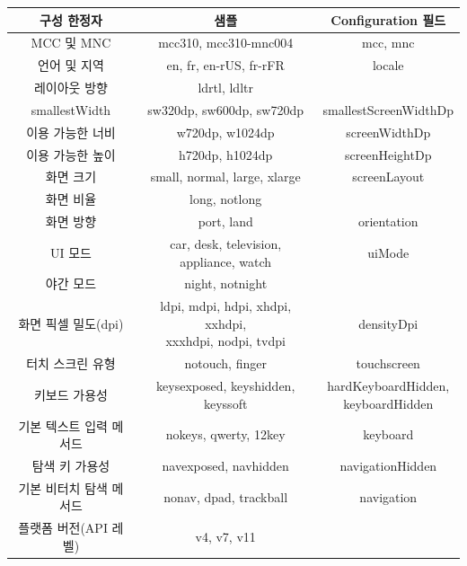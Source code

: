 \begin{longtable}{|c|c|c|}\hline
구성 한정자 & 샘플 & Configuration 필드 \\ \hline
MCC 및 MNC	& mcc310, mcc310-mnc004  & mcc, mnc \\ \hline
언어 및 지역 & en, fr, en-rUS, fr-rFR & locale \\ \cline{1-2}
레이아웃 방향	& ldrtl, ldltr & \\ \hline
smallestWidth & sw320dp, sw600dp, sw720dp & smallestScreenWidthDp \\ \hline
이용 가능한 너비 & w720dp, w1024dp & screenWidthDp \\ \hline
이용 가능한 높이 & h720dp, h1024dp & screenHeightDp \\ \hline
화면 크기 & small, normal, large, xlarge & screenLayout \\  \cline{1-2}
화면 비율 & long, notlong & \\ \hline
화면 방향 & port, land & orientation \\ \hline
UI 모드	& car, desk, television, appliance, watch & uiMode\\ \cline{1-2}
야간 모드	 & night, notnight &  \\ \hline
화면 픽셀 밀도(dpi) &	\makecell{ldpi, mdpi, hdpi, xhdpi, xxhdpi, \\ xxxhdpi, nodpi, tvdpi} & densityDpi\\ \hline
터치 스크린 유형 &	notouch, finger	& touchscreen \\ \hline
키보드 가용성 & keysexposed, keyshidden, keyssoft	& \makecell{hardKeyboardHidden, \\ keyboardHidden} \\ \hline
기본 텍스트 입력 메서드	& nokeys, qwerty, 12key & keyboard \\ \hline
탐색 키 가용성 & navexposed, navhidden	 & navigationHidden \\ \hline
기본 비터치 탐색 메서드 & nonav, dpad, trackball & navigation \\ \hline
플랫폼 버전(API 레벨) & v4, v7, v11 & \\ \hline
\end{longtable}

